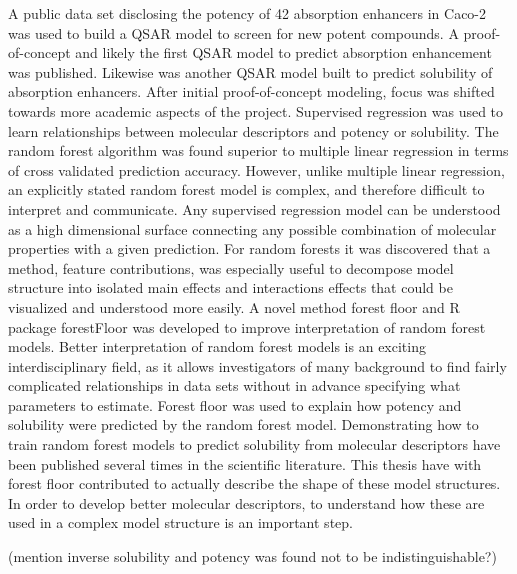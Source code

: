A public data set disclosing the potency of 42 absorption enhancers in Caco-2 was used to build a QSAR model to screen for new potent compounds. A proof-of-concept and likely the first QSAR model to predict absorption enhancement was published. Likewise was another QSAR model built to predict solubility of absorption enhancers. After initial proof-of-concept modeling, focus was shifted towards more academic aspects of the project. Supervised regression was used to learn relationships between molecular descriptors and potency or solubility. The random forest algorithm was found superior to multiple linear regression in terms of cross validated prediction accuracy. However, unlike multiple linear regression, an explicitly stated random forest model is complex, and therefore difficult to interpret and communicate. Any supervised regression model can be understood as a high dimensional surface connecting any possible combination of molecular properties with a given prediction. For random forests it was discovered that a method, feature contributions, was especially useful to decompose model structure into isolated main effects and interactions effects that could be visualized and understood more easily. A novel method forest floor and R package forestFloor was developed to improve interpretation of random forest models. Better interpretation of random forest models is an exciting interdisciplinary field, as it allows investigators of many background to find fairly complicated relationships in data sets without in advance specifying what parameters to estimate. Forest floor was used to explain how potency and solubility were predicted by the random forest model. Demonstrating how to train random forest models to predict solubility from molecular descriptors have been published several times in the scientific literature. This thesis have with forest floor contributed to actually describe the shape of these model structures. In order to develop better molecular descriptors, to understand how these are used in a complex model structure is an important step.

(mention inverse solubility and potency was found not to be indistinguishable?)